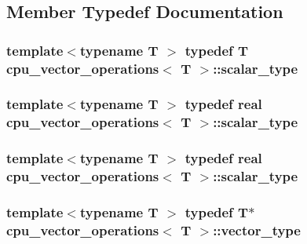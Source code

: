 \subsection{Member Typedef Documentation}
\hypertarget{structcpu__vector__operations_aca6b216aa1fb172df83d98350e94fd61}{
\subsubsection[{scalar\-\_\-type}]{\setlength{\rightskip}{0pt plus 5cm}template$<$typename T $>$ typedef T {\bf cpu\-\_\-vector\-\_\-operations}$<$ T $>$\-::{\bf scalar\-\_\-type}}}\label{structcpu__vector__operations_aca6b216aa1fb172df83d98350e94fd61}
\hypertarget{structcpu__vector__operations_ab4a2755f01dbbf6deb948a4cf614eb14}{
\subsubsection[{scalar\-\_\-type}]{\setlength{\rightskip}{0pt plus 5cm}template$<$typename T $>$ typedef {\bf real} {\bf cpu\-\_\-vector\-\_\-operations}$<$ T $>$\-::{\bf scalar\-\_\-type}}}\label{structcpu__vector__operations_ab4a2755f01dbbf6deb948a4cf614eb14}
\hypertarget{structcpu__vector__operations_ab4a2755f01dbbf6deb948a4cf614eb14}{
\subsubsection[{scalar\-\_\-type}]{\setlength{\rightskip}{0pt plus 5cm}template$<$typename T $>$ typedef {\bf real} {\bf cpu\-\_\-vector\-\_\-operations}$<$ T $>$\-::{\bf scalar\-\_\-type}}}\label{structcpu__vector__operations_ab4a2755f01dbbf6deb948a4cf614eb14}
\hypertarget{structcpu__vector__operations_a1962836df596ce262704d208e9a6d8f9}{
\subsubsection[{vector\-\_\-type}]{\setlength{\rightskip}{0pt plus 5cm}template$<$typename T $>$ typedef T$\ast$ {\bf cpu\-\_\-vector\-\_\-operations}$<$ T $>$\-::{\bf vector\-\_\-type}}}\label{structcpu__vector__operations_a1962836df596ce262704d208e9a6d8f9}
